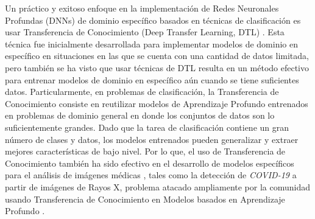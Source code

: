 Un práctico y exitoso enfoque en la implementación de Redes Neuronales Profundas (DNNs) de dominio
específico \cite{liu2017survey} basados en técnicas de clasificación es usar Transferencia de
Conocimiento (Deep Transfer Learning, DTL) \cite{long2016unsupervised,oquab2014learning,tan2018survey}.
Esta técnica fue inicialmente desarrollada para implementar modelos de dominio en específico en
situaciones en las que se cuenta con una cantidad de datos limitada, pero también se ha visto que
usar técnicas de DTL resulta en un método efectivo para entrenar modelos de dominio en específico aún
cuando se tiene suficientes datos. Particularmente, en problemas de clasificación, la Transferencia
de Conocimiento consiste en reutilizar modelos de Aprendizaje Profundo entrenados en problemas de
dominio general en donde los conjuntos de datos son lo suficientemente grandes. Dado que la tarea de
clasificación contiene un gran número de clases y datos, los modelos entrenados pueden generalizar y
extraer mejores características de bajo nivel. Por lo que, el uso de Transferencia de Conocimiento
también ha sido efectivo en el desarrollo de modelos específicos para el análisis de imágenes médicas
\cite{deniz2018transfer,litjens2017survey, sufian2020survey}, tales como la detección de
\textit{COVID-19} a partir de imágenes de Rayos X, problema atacado ampliamente por la comunidad
usando Transferencia de Conocimiento en Modelos basados en Aprendizaje Profundo
\cite{agrawal2021focuscovid,ai2020correlation,sufian2020survey}.

